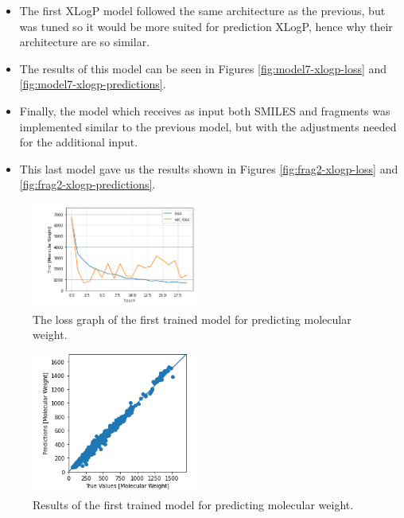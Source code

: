 \begin{itemize}
        \item The first XLogP model followed the same architecture as the previous, but was tuned so it would be more suited for prediction XLogP, hence why their architecture are so similar.
        \item The results of this model can be seen in Figures \ref{fig:model7-xlogp-loss} and \ref{fig:model7-xlogp-predictions}.
        \item Finally, the model which receives as input both SMILES and fragments was implemented similar to the previous model, but with the adjustments needed for the additional input.
        \item This last model gave us the results shown in Figures \ref{fig:frag2-xlogp-loss} and \ref{fig:frag2-xlogp-predictions}.
    \end{itemize}
    
    \begin{figure}
        \centering
        \includegraphics[width=0.5\textwidth]{loss_gragh_20_epoch.PNG}
        \caption{The loss graph of the first trained model for predicting molecular weight.}
        \label{fig:model2-mol-weight-loss}
    \end{figure}
    \begin{figure}
        \centering
        \includegraphics[width=0.5\textwidth]{model_2_prediction.PNG}
        \caption{Results of the first trained model for predicting molecular weight.}
        \label{fig:model2-mol-weight-predictions}
    \end{figure}
    

